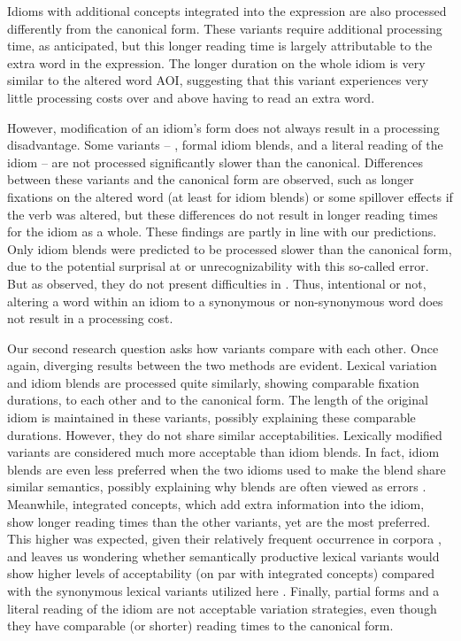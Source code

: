 \documentclass[output=paper
,modfonts
,nonflat]{langsci/langscibook}
\begin{document}
Idioms  with additional concepts integrated  into the expression are also processed differently from the canonical form. These variants require additional processing  time, as anticipated, but this longer reading time is largely attributable to the extra word in the expression. The longer duration on the whole idiom is very similar to the altered word AOI, suggesting that this variant experiences very little processing costs over and above having to read an extra word.
 
However, modification of an idiom's form does not always result in a processing disadvantage. Some variants -- , formal idiom  blends, and a literal  reading of the idiom -- are not processed significantly slower than the canonical. Differences between these variants and the canonical form are observed, such as longer fixations on the altered word (at least for idiom blends) or some spillover effects if the verb was altered, but these differences do not result in longer reading times for the idiom as a whole. These findings are partly in line with our predictions. Only idiom blends were predicted to be processed slower than the canonical form, due to the potential surprisal at or unrecognizability with this so-called error. But as observed, they do not present difficulties in . Thus, intentional or not, altering a word within an idiom to a synonymous or non-synonymous word does not result in a processing cost.

Our second research question asks how variants compare with each other. Once again, diverging results between the two methods are evident.  Lexical variation and idiom blends are processed quite similarly, showing comparable fixation durations, to each other and to the canonical form. The length of the original idiom is maintained in these variants, possibly explaining these comparable durations. However, they do not share similar acceptabilities.  Lexically modified variants  are considered much more acceptable than idiom blends. In fact, idiom blends  are even less preferred when the two idioms used to make the blend share similar semantics, possibly explaining why blends are often viewed as errors \citep{Fay1982, CuttingBock1997}. Meanwhile, integrated concepts,  which add extra information into the idiom, show longer reading times than the other variants, yet are the most preferred. This higher  was expected, given their relatively frequent occurrence in corpora \citep{Moon1998, Schroder2013}, and leaves us wondering whether semantically productive lexical variants  \citep[cf.][]{McGloneEtAl1994} would show higher levels of acceptability (on par with integrated concepts) compared with the synonymous lexical variants utilized here \citep[following][]{GibbsEtAl1989}. Finally, partial forms  and a literal reading  of the idiom are not acceptable variation strategies, even though they have comparable (or shorter) reading times to the canonical form.
\end{document}
